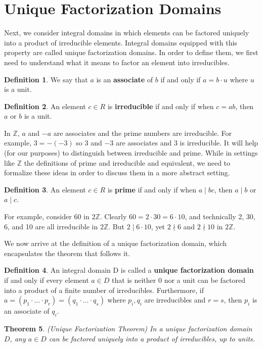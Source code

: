 \documentclass[11pt]{amsart}
\newtheorem{theorem}{Theorem}[section]
\theoremstyle{definition}
\newtheorem{definition}[theorem]{Definition}
\newcommand{\integers}{\mathbb{Z}}
\begin{document}
\section{Unique Factorization Domains}
Next, we consider integral domains in which elements can be factored uniquely into a product of irreducible elements. Integral domains
equipped with this property are called unique factorization domains. In order to define them, we first need to understand what it means to
factor an element into irreducibles.
\begin{definition}
	We say that $a$ is an \textbf{associate} of $b$ if and only if $a = b \cdot u$ where $u$ is a unit.
\end{definition}
\begin{definition}
	An element $c \in R$ is \textbf{irreducible} if and only if when $c = ab$, then $a$ or $b$ is a unit.
\end{definition}
In $\integers$, $a$ and $-a$ are associates and the prime numbers are irreducible. For example, $3 = -(-3)$ so 3 and $-3$ are
associates and 3 is irreducible. It will help (for our purposes) to distinguish between irreducible and prime. While in settings like $\integers$
the definitions of prime and irreducible and equivalent, we need to formalize these ideas in order to discuss them in a more abstract
setting.
\begin{definition}
	An element $c \in R$ is \textbf{prime} if and only if when $a \mid bc$, then $a \mid b$ or $a \mid c$.
\end{definition}
For example, consider 60 in $2\integers$. Clearly $60 = 2 \cdot 30 = 6 \cdot 10$, and technically 2, 30, 6, and 10 are all irreducible in 
$2\integers$. But $2 \mid 6 \cdot 10$, yet $2 \nmid 6$ and $2 \nmid 10$ in $2\integers$.

We now arrive at the definition of a unique factorization domain, which encapsulates the theorem that follows it.
\begin{definition}
	An integral domain D is called a \textbf{unique factorization domain} if and only if every element $a \in D$ that is neither 0 nor a unit
	can be factored into a product of a finite number of irreducibles. Furthermore, if $a = (p_1 \cdot \dots \cdot p_r) 
	= (q_1 \cdot \dots \cdot q_s)$ where $p_i, q_i$ are irreducibles and $r = s$, then $p_i$ is an associate of $q_i$.
\end{definition}
\begin{theorem}{(Unique Factorization Theorem)}
	In a unique factorization domain $D$, any $a \in D$ can be factored uniquely into a product of irreducibles, up to units.
\end{theorem}
\end{document}
